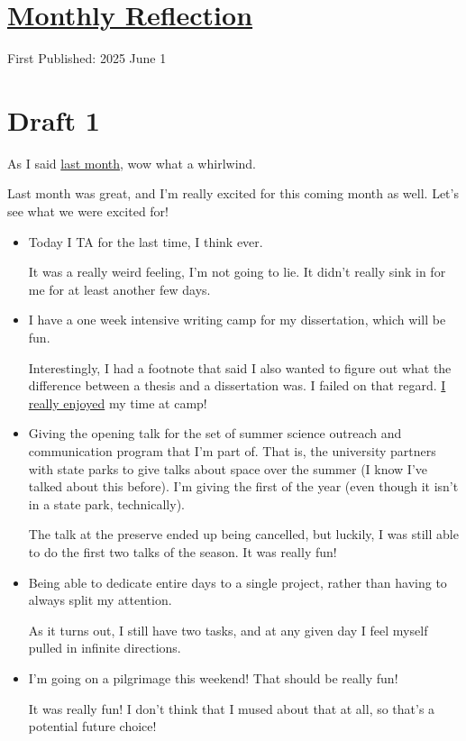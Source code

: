 \documentclass[12pt]{article}
\renewcommand{\,}{\textsuperscript{,}}
\begin{document}
  
\doublespacing  
\section{\href{reflection-may-25.html}{Monthly Reflection}}  
First Published: 2025 June 1

\section{Draft 1}  
As I said \href{reflection-april-25}{last month}, wow what a whirlwind.

Last month was great, and I'm really excited for this coming month as well.  
Let's see what we were excited for!

\begin{itemize}  
\item Today I TA for the last time, I think ever.

It was a really weird feeling, I'm not going to lie. It didn't really sink in for me for at least another few days.

\item I have a one week intensive writing camp for my dissertation, which will be fun.

Interestingly, I had a footnote that said I also wanted to figure out what the difference between a thesis and a dissertation was.  
I failed on that regard.  
\href{dissertation-camp}{I really enjoyed} my time at camp!

\item Giving the opening talk for the set of summer science outreach and communication program that I'm part of. That is, the university partners with state parks to give talks about space over the summer (I know I've talked about this before). I'm giving the first of the year (even though it isn't in a state park, technically).

The talk at the preserve ended up being cancelled, but luckily, I was still able to do the first two talks of the season. It was really fun!

\item Being able to dedicate entire days to a single project, rather than having to always split my attention.

As it turns out, I still have two tasks, and at any given day I feel myself pulled in infinite directions.

\item I'm going on a pilgrimage this weekend! That should be really fun!

It was really fun! I don't think that I mused about that at all, so that's a potential future choice!

\end{itemize}
\end{document}
